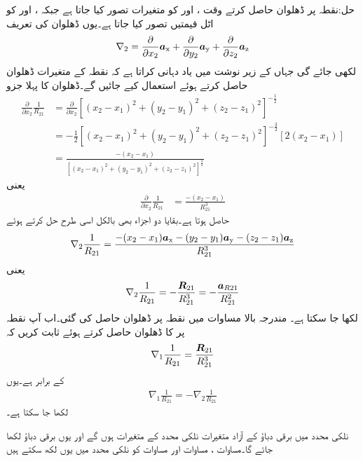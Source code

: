 حل:نقطہ  پر ڈھلوان حاصل کرتے وقت ،  اور  کو متغیرات تصور کیا جاتا ہے جبکہ ،  اور  کو اٹل قیمتیں تصور کیا جاتا ہے۔یوں ڈھلوان کی تعریف
\begin{align*}
\nabla_2 =\frac{\partial }{\partial x_2} {\boldsymbol{a}}_{\textup{x}}+\frac{\partial }{\partial y_2} {\boldsymbol{a}}_{\textup{y}}+\frac{\partial }{\partial z_2} {\boldsymbol{a}}_{\textup{z}} 
\end{align*}
لکھی جائے گی جہاں  کے زیر نوشت میں  یاد دہانی کراتا ہے کہ نقطہ  کے متغیرات ڈھلوان حاصل کرتے ہوئے استعمال کیے جائیں گے۔ڈھلوان کا پہلا جزو
\begin{align*}
\frac{\partial }{\partial x_2} \frac{1}{R_{21}} &=\frac{\partial }{\partial x_2}[(x_2-x_1)^2+(y_2-y_1)^2+(z_2-z_1)^2]^{-\frac{1}{2}}\\
&=-\frac{1}{2} [(x_2-x_1)^2+(y_2-y_1)^2+(z_2-z_1)^2]^{-\frac{3}{2}} \left[2(x_2-x_1)\right]\\
&=\frac{-(x_2-x_1)}{ [(x_2-x_1)^2+(y_2-y_1)^2+(z_2-z_1)^2]^{\frac{3}{2}}}
\end{align*}
یعنی
\begin{align*}
\frac{\partial }{\partial x_2} \frac{1}{R_{21}} &=\frac{-(x_2-x_1)}{R_{21}^3}
\end{align*}
حاصل ہوتا ہے۔بقایا دو اجزاء بھی بالکل اسی طرح حل کرتے ہوئے
\begin{align*}
\nabla_2 \frac{1}{R_{21}} =\frac{-(x_2-x_1){\boldsymbol{a}}_{\textup{x}}-(y_2-y_1){\boldsymbol{a}}_{\textup{y}}-(z_2-z_1){\boldsymbol{a}}_{\textup{z}}}{R_{21}^3}
\end{align*}
یعنی
\begin{align}\label{مساوات_توانائی_فاصلہ_ڈھلوان}
\nabla_2 \frac{1}{R_{21}} =-\frac{{{\boldsymbol{R}}}_{21}}{R_{21}^3}=-\frac{{{\boldsymbol{a}}}_{R21}}{R_{21}^2}
\end{align}
لکھا جا سکتا ہے۔
مندرجہ بالا مساوات میں نقطہ  پر ڈھلوان حاصل کی گئی۔اب آپ نقطہ  پر  کا ڈھلوان حاصل کرتے ہوئے ثابت کریں کہ
\begin{align}
\nabla_1 \frac{1}{R_{21}} =\frac{{{\boldsymbol{R}}}_{21}}{R_{21}^3}
\end{align}
کے برابر ہے۔یوں 
\begin{align}\label{مساوات_توانائی_فاصلے_کی_ڈھلوان_ب}
\nabla_1 \frac{1}{R_{21}}=-\nabla_2 \frac{1}{R_{21}}
\end{align}
لکھا جا سکتا ہے۔

نلکی محدد میں برقی دباؤ کے آزاد متغیرات نلکی محدد کے متغیرات ہوں گے اور یوں برقی دباؤ  لکھا جائے گا۔مساوات ، مساوات  اور مساوات  کو نلکی محدد میں یوں لکھ سکتے ہیں

